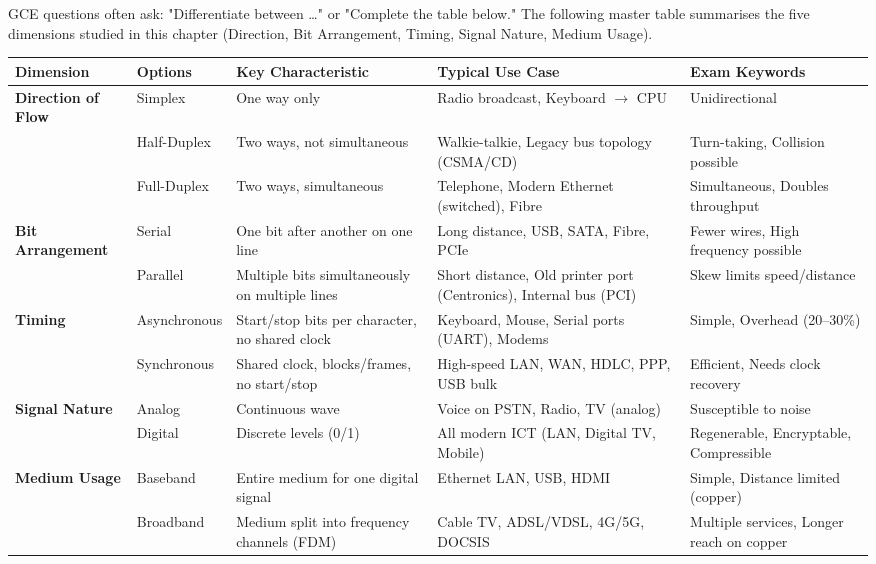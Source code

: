 \documentclass[11pt]{article}
\begin{document}
GCE questions often ask: "Differentiate between …" or "Complete the table below." The following master table summarises the five dimensions studied in this chapter (Direction, Bit Arrangement, Timing, Signal Nature, Medium Usage).

\begin{center}
\begin{tabularx}{\linewidth}{|l|X|X|X|X|}
\hline
\rowcolor{popblueL}
\textbf{Dimension} & \textbf{Options} & \textbf{Key Characteristic} & \textbf{Typical Use Case} & \textbf{Exam Keywords} \\
\hline
\textbf{Direction of Flow} & Simplex & One way only & Radio broadcast, Keyboard $\to$ CPU & Unidirectional \\
& Half-Duplex & Two ways, not simultaneous & Walkie-talkie, Legacy bus topology (CSMA/CD) & Turn-taking, Collision possible \\
& Full-Duplex & Two ways, simultaneous & Telephone, Modern Ethernet (switched), Fibre & Simultaneous, Doubles throughput \\
\hline
\textbf{Bit Arrangement} & Serial & One bit after another on one line & Long distance, USB, SATA, Fibre, PCIe & Fewer wires, High frequency possible \\
& Parallel & Multiple bits simultaneously on multiple lines & Short distance, Old printer port (Centronics), Internal bus (PCI) & Skew limits speed/distance \\
\hline
\textbf{Timing} & Asynchronous & Start/stop bits per character, no shared clock & Keyboard, Mouse, Serial ports (UART), Modems & Simple, Overhead (20–30\%) \\
& Synchronous & Shared clock, blocks/frames, no start/stop & High-speed LAN, WAN, HDLC, PPP, USB bulk & Efficient, Needs clock recovery \\
\hline
\textbf{Signal Nature} & Analog & Continuous wave & Voice on PSTN, Radio, TV (analog) & Susceptible to noise \\
& Digital & Discrete levels (0/1) & All modern ICT (LAN, Digital TV, Mobile) & Regenerable, Encryptable, Compressible \\
\hline
\textbf{Medium Usage} & Baseband & Entire medium for one digital signal & Ethernet LAN, USB, HDMI & Simple, Distance limited (copper) \\
& Broadband & Medium split into frequency channels (FDM) & Cable TV, ADSL/VDSL, 4G/5G, DOCSIS & Multiple services, Longer reach on copper \\
\hline
\end{tabularx}
\end{center}
\end{document}
